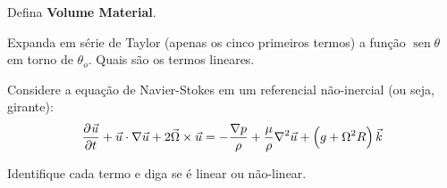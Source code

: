 \documentclass[letterpaper,portuguese,12pt,pdftex]{exam}
\newcommand{\sen}{\operatorname{sen}}
\begin{document}
\begin{questions}

\question[1]
Defina {\bf Volume Material}.
\makeemptybox{12cm}

\question[2]
Expanda em série de Taylor (apenas os cinco primeiros termos) a função
$\sen{\theta}$ em torno de $\theta_o$.  Quais são os termos lineares.
\makeemptybox{12cm}

\question[2]
Considere a equação de Navier-Stokes em um referencial não-inercial (ou seja,
girante):
\[
  \dpd{\vec{u}}{t} + \vec{u} \cdot \nabla \vec{u} + 2\vec{\Omega} \times \vec{u} = -\dfrac{\nabla p}{\rho} + \dfrac{\mu}{\rho}\nabla^2\vec{u} + \left( g + \Omega^2R \right)\vec{k}
\]

Identifique cada termo e diga se é linear ou não-linear.

\makeemptybox{12cm}

\begin{center}
\gradetable[h][questions]
\end{center}

\end{questions}
\end{document}
